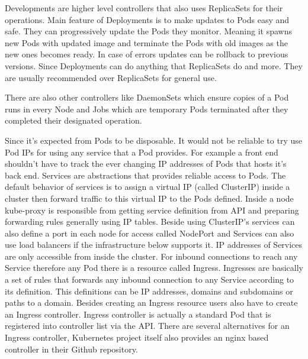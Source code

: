 \documentclass[12pt,oneandhalf,chaparabic,ceng,ms,eng,oneside,pntc]{gsufbe}
\begin{document}
Developments are higher level controllers that also uses ReplicaSets for their operations.  Main feature
of Deployments is to make updates to Pods easy and safe.  They can progressively update the Pods they
monitor.  Meaning it spawns new Pods with updated image and terminate the Pods with old images as
the new ones becomes ready.  In case of errors updates can be rollback to previous versions.  Since
Deployments can do anything that ReplicaSets do and more.  They are usually recommended over ReplicaSets
for general use.

There are also other controllers like DaemonSets which ensure copies of a Pod runs in every Node and
Jobs which are temporary Pods terminated after they completed their designated operation.

Since it’s expected from Pods to be disposable.  It would not be reliable to try use Pod IPs for using
any service that a Pod provides.  For example a front end shouldn’t have to track the ever changing IP
addresses of Pods that hosts it’s back end.  Services are abstractions that provides reliable access to
Pods.  The default behavior of services is to assign a virtual IP (called ClusterIP) inside a cluster
then forward traffic to this virtual IP to the Pods defined.  Inside a node kube-proxy is responsible
from getting service definition from API and preparing forwarding rules generally using IP tables.
Beside using ClusterIP’s services can also define a port in each node for access called NodePort and
Services can also use load balancers if the infrastructure below supports it.  
\cite{marmol_networking_2015}
IP addresses of Services are only accessible from inside the cluster.  For inbound connections to reach
any Service therefore any Pod there is a resource called Ingress.  Ingresses are basically a set of rules
that forwards any inbound connection to any Service according to its definition.  This definitions can
be IP addresses, domains and subdomains or paths to a domain.  Besides creating an Ingress resource
users also have to create an Ingress controller.  Ingress controller is actually a standard Pod that is
registered into controller list via the API.  There are several alternatives for an Ingress controller,
Kubernetes project itself also provides an nginx based controller in their Github repository.

\end{document}
